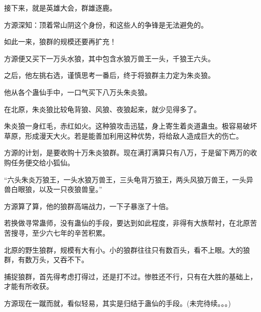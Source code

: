 \begin{this_body}
接下来，就是英雄大会，群雄逐鹿。

方源深知：顶着常山阴这个身份，和这些人的争锋是无法避免的。

如此一来，狼群的规模还要再扩充！

方源便又买下一万头水狼，其中包含水狼万兽王一头，千狼王六头。

之后，他左挑右选，谨慎思考一番后，终于将狼群主力定为朱炎狼。

他从各个蛊仙手中，一口气买下八万头朱炎狼。

在北原，朱炎狼比较龟背狼、风狼、夜狼起来，就少见得多了。

朱炎狼一身红毛，赤红如火。这种狼攻击迅猛，身上寄生着炎道蛊虫。极容易破坏草原，形成漫天大火。若是能善加利用这种优势，将给敌人造成巨大的伤亡。

方源的计划，是要收购十万朱炎狼群。现在满打满算只有八万，于是留下两万的收购任务便交给小狐仙。

“六头朱炎万狼王，一头水狼万兽王，三头龟背万狼王，两头风狼万兽王，一头异兽白眼狼，以及一只夜狼兽皇。”

方源算了算，他的狼群高端战力，一下子暴涨了十倍。

若换做寻常蛊师，没有蛊仙的手段，要达到如此程度，非得有大族帮衬，在北原苦苦搜寻，至少六七年的辛苦积累。

北原的野生狼群，规模有大有小。小的狼群往往只有数百头，看不上眼。大的狼群，有数万头，又吞不下。

捕捉狼群，首先得考虑打得过，还是打不过。惨胜还不行，只有在大胜的基础上，才能有所收获。

方源现在一蹴而就，看似轻易，其实是归结于蛊仙的手段。(未完待续。。。)

\end{this_body}

